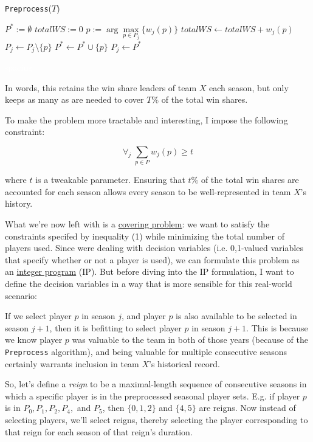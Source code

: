 \documentclass[a4paper,11pt]{article}
\begin{document}
	\begin{algorithm} [H]
	\caption{\texttt{Preprocess}($T$)}
	 {
		$P^* := \emptyset$\;
		$totalWS := 0$\;
       	 {
		$p := \arg \! \max \limits_{p \in P_j} \{w_j(p)\}$\;
		$totalWS \leftarrow totalWS + w_j(p)$\;
		$P_j \leftarrow P_j \setminus \{p\}$\;
		$P^* \leftarrow P^* \cup \{p\}$\;
	}
	$P_j \leftarrow P^*$\;
	}
	\end{algorithm}


\textcolor{white}{spacing}

In words, this retains the win share leaders of team $X$ each season, but only keeps as many as are needed to cover $T\%$ of the total win shares.

To make the problem more tractable and interesting, I impose the following constraint:

\begin{equation}
\forall_j  \; \sum_{p \in P} w_j(p) \ge t
\end{equation}

\noindent where $t$ is a tweakable parameter. Ensuring that $t\%$ of the total win shares are accounted for each season allows every season to be well-represented in team $X$'s history.

What we're now left with is a \href{http://en.wikipedia.org/wiki/Covering_problems}{covering problem}: we want to satisfy the constraints specifed by inequality (1) while minimizing the total number of players used. Since were dealing with decision variables (i.e. 0,1-valued variables that specify whether or not a player is used), we can formulate this problem as an \href{http://en.wikipedia.org/wiki/Integer_programming}{integer program} (IP). But before diving into the IP formulation, I want to define the decision variables in a way that is more sensible for this real-world scenario:

If we select player $p$ in season $j$, and player $p$ is also available to be selected in season $j+1$, then it is befitting to select player $p$ in season $j+1$. This is because we know player $p$ was valuable to the team in both of those years (because of the \texttt{Preprocess} algorithm), and being valuable for multiple consecutive seasons certainly warrants inclusion in team $X$'s historical record.

So, let's define a \emph{reign} to be a maximal-length sequence of consecutive seasons in which a specific player is in the preprocessed seasonal player sets. E.g. if player $p$ is in $P_0,P_1,P_2,P_4,$ and $P_5$, then $\{0,1,2\}$ and $\{4,5\}$ are reigns. Now instead of selecting players, we'll select reigns, thereby selecting the player corresponding to that reign for each season of that reign's duration. 
\end{document}

